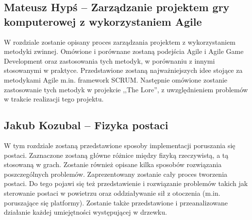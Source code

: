 \documentclass[oneside,polski,logo]{amuthesis}
\begin{document}
\subsection{Mateusz Hypś – Zarządzanie projektem gry komputerowej z wykorzystaniem Agile}
W rozdziale zostanie opisany proces zarządzania projektem z wykorzystaniem metodyki zwinnej. Omówione i porównane zostaną podejścia Agile i Agile Game Development oraz zastosowania tych metodyk, w porównaniu z innymi stosowanymi w praktyce. Przedstawione zostaną najważniejszych idee stojące za metodykami Agile m.in. framework SCRUM. Następnie omówione zostanie zastosowanie tych metodyk w projekcie ,,The Lore”, z uwzględnieniem problemów w trakcie realizacji tego projektu. 

\subsection{Jakub Kozubal – Fizyka postaci}
W tym rozdziale zostaną przedstawione sposoby implementacji poruszania się postaci. Zaznaczone zostaną główne różnice między fizyką rzeczywistą, a tą stosowaną w grach. Zostanie również opisane kilka sposobów rozwiązania poszczególnych problemów. Zaprezentowany zostanie cały proces tworzenia postaci. Do tego pojawi się też przedstawienie i rozwiązanie problemów takich jak sterowanie postaci w powietrzu oraz oddziaływanie sił z otoczenia (m.in. poruszające się platformy). Zostanie także przedstawione i przeanalizowane działanie każdej umiejętności występującej w drzewku.
\end{document}
